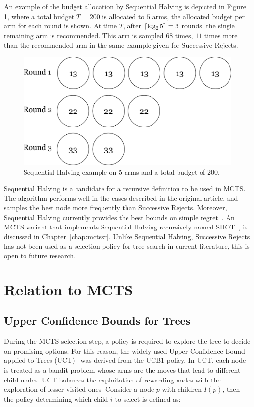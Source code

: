 \documentclass{kecsmstr}
\DeclarePairedDelimiter{\ceil}{\lceil}{\rceil}
\begin{document}
An example of the budget allocation by Sequential Halving is depicted in Figure \ref{fig:seq-halving}, where a total budget $T = 200$ is allocated to $5$ arms, the allocated budget per arm for each round is shown. At time $T$, after $\ceil{\log_2{5}}=3$ rounds, the single remaining arm is recommended. This arm is sampled $68$ times, $11$ times more than the recommended arm in the same example given for Successive Rejects.

\begin{figure}[ht]
	\centering
	\includegraphics[width=.6\textwidth]{img/seq_halving.png}
	\caption[Sequential Halving example]{Sequential Halving example on 5 arms and a total budget of 200.}
	\label{fig:seq-halving}
\end{figure}

Sequential Halving is a candidate for a recursive definition to be used in MCTS. The algorithm performs well in the cases described in the original article, and samples the best node more frequently than Successive Rejects. Moreover, Sequential Halving currently provides the best bounds on simple regret~. An MCTS variant that implements Sequential Halving recursively named SHOT~, is discussed in Chapter~\ref{chap:mctssr}. Unlike Sequential Halving, Successive Rejects has not been used as a selection policy for tree search in current literature, this is open to future research. 

\section{Relation to MCTS}
\label{sec:mabmcts}

\subsection{Upper Confidence Bounds for Trees}
During the MCTS selection step, a policy is required to explore the tree to decide on promising options. For this reason, the widely used Upper Confidence Bound applied to Trees (UCT)~ was derived from the UCB1 policy. In UCT, each node is treated as a bandit problem whose arms are the moves that lead to different child nodes. UCT balances the exploitation of rewarding nodes with the exploration of lesser visited ones. Consider a node $p$ with children $I(p)$, then the policy determining which child $i$ to select is defined as:
\end{document}
